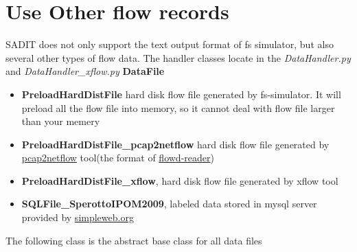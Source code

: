 \documentclass[letterpaper,10pt,english]{sphinxmanual}
\begin{document}
\section{Use Other flow records}
\label{index:use-other-flow-records}
SADIT does not only support the text output format of fs simulator, but also
several other types of flow data. The handler classes locate in the
\emph{DataHandler.py} and \emph{DataHandler\_xflow.py}
\textbf{DataFile}
\begin{itemize}
\item {} 
\textbf{PreloadHardDistFile} hard disk flow file generated by fs-simulator. It
will preload all the flow file into memory, so it cannot deal with flow
file larger than your memery

\item {} 
\textbf{PreloadHardDistFile\_pcap2netflow} hard disk flow file generated by
\href{https://bitbucket.org/hbhzwj/pcap2netflow/src}{pcap2netflow} tool(the
format of \href{http://www.mindrot.org/projects/softflowd/}{flowd-reader})

\item {} 
\textbf{PreloadHardDistFile\_xflow}, hard disk flow file generated by xflow tool

\item {} 
\textbf{SQLFile\_SperottoIPOM2009}, labeled data stored in mysql server provided
by \href{http://traces.simpleweb.org/traces/netflow/netflow2/}{simpleweb.org}

\end{itemize}

The following class is the abstract base class for all data files
\end{document}
